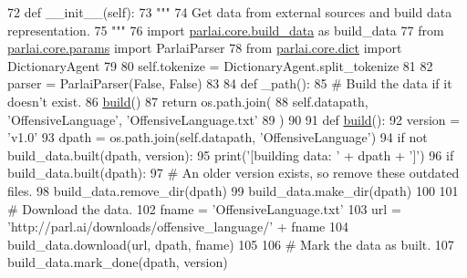 \begin{DoxyCode}
72     \textcolor{keyword}{def }\_\_init\_\_(self):
73         \textcolor{stringliteral}{"""}
74 \textcolor{stringliteral}{        Get data from external sources and build data representation.}
75 \textcolor{stringliteral}{        """}
76         \textcolor{keyword}{import} \hyperlink{namespaceparlai_1_1core_1_1build__data}{parlai.core.build\_data} \textcolor{keyword}{as} build\_data
77         \textcolor{keyword}{from} \hyperlink{namespaceparlai_1_1core_1_1params}{parlai.core.params} \textcolor{keyword}{import} ParlaiParser
78         \textcolor{keyword}{from} \hyperlink{namespaceparlai_1_1core_1_1dict}{parlai.core.dict} \textcolor{keyword}{import} DictionaryAgent
79 
80         self.tokenize = DictionaryAgent.split\_tokenize
81 
82         parser = ParlaiParser(\textcolor{keyword}{False}, \textcolor{keyword}{False})
83 
84         \textcolor{keyword}{def }\_path():
85             \textcolor{comment}{# Build the data if it doesn't exist.}
86             \hyperlink{namespaceparlai_1_1mturk_1_1tasks_1_1talkthewalk_1_1download_a8c0fbb9b6dfe127cb8c1bd6e7c4e33fd}{build}()
87             \textcolor{keywordflow}{return} os.path.join(
88                 self.datapath, \textcolor{stringliteral}{'OffensiveLanguage'}, \textcolor{stringliteral}{'OffensiveLanguage.txt'}
89             )
90 
91         \textcolor{keyword}{def }\hyperlink{namespaceparlai_1_1mturk_1_1tasks_1_1talkthewalk_1_1download_a8c0fbb9b6dfe127cb8c1bd6e7c4e33fd}{build}():
92             version = \textcolor{stringliteral}{'v1.0'}
93             dpath = os.path.join(self.datapath, \textcolor{stringliteral}{'OffensiveLanguage'})
94             \textcolor{keywordflow}{if} \textcolor{keywordflow}{not} build\_data.built(dpath, version):
95                 print(\textcolor{stringliteral}{'[building data: '} + dpath + \textcolor{stringliteral}{']'})
96                 \textcolor{keywordflow}{if} build\_data.built(dpath):
97                     \textcolor{comment}{# An older version exists, so remove these outdated files.}
98                     build\_data.remove\_dir(dpath)
99                 build\_data.make\_dir(dpath)
100 
101                 \textcolor{comment}{# Download the data.}
102                 fname = \textcolor{stringliteral}{'OffensiveLanguage.txt'}
103                 url = \textcolor{stringliteral}{'http://parl.ai/downloads/offensive\_language/'} + fname
104                 build\_data.download(url, dpath, fname)
105 
106                 \textcolor{comment}{# Mark the data as built.}
107                 build\_data.mark\_done(dpath, version)

\end{DoxyCode}
